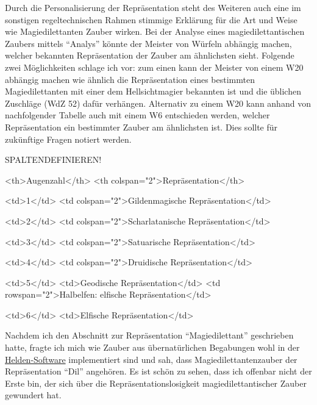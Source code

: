 Durch die Personalisierung der Repräsentation steht des Weiteren auch eine im sonstigen regeltechnischen Rahmen stimmige Erklärung für die Art und Weise wie Magiedilettanten Zauber wirken. Bei der Analyse eines magiedilettantischen Zaubers mittels \enquote{Analys} könnte der Meister von Würfeln abhängig machen, welcher bekannten Repräsentation der Zauber am ähnlichsten sieht. Folgende zwei Möglichkeiten schlage ich vor: zum einen kann der Meister von einem W20 abhängig machen wie ähnlich die Repräsentation eines bestimmten Magiedilettanten mit einer dem Hellsichtmagier bekannten ist und die üblichen Zuschläge (WdZ 52) dafür verhängen. Alternativ zu einem W20 kann anhand von nachfolgender Tabelle auch mit einem W6 entschieden werden, welcher Repräsentation ein bestimmter Zauber am ähnlichsten ist. Dies sollte für zukünftige Fragen notiert werden.
\begin{table}
	\centering
	\caption[Kurzbeschreibung für Verzeichnis]{Langbezeichnung für direkte Anzeige\label{identifier-vergeben}}
	\begin{tabular}{SPALTENDEFINIEREN!}
		\toprule

<th>Augenzahl</th>
<th colspan="2">Repräsentation</th>


<td>1</td>
<td colspan="2">Gildenmagische Repräsentation</td>


<td>2</td>
<td colspan="2">Scharlatanische Repräsentation</td>


<td>3</td>
<td colspan="2">Satuarische Repräsentation</td>


<td>4</td>
<td colspan="2">Druidische Repräsentation</td>


<td>5</td>
<td>Geodische Repräsentation</td>
<td rowspan="2">Halbelfen: elfische Repräsentation</td>


<td>6</td>
<td>Elfische Repräsentation</td>

		\bottomrule
	\end{tabular}
\end{table}

Nachdem ich den Abschnitt zur Repräsentation \enquote{Magiedilettant} geschrieben hatte, fragte ich mich wie Zauber aus übernatürlichen Begabungen wohl in der \href{http://www.helden-software.de/}{Helden-Software} implementiert sind und sah, dass Magiedilettantenzauber der Repräsentation \enquote{Dil} angehören. Es ist schön zu sehen, dass ich offenbar nicht der Erste bin, der sich über die Repräsentationslosigkeit magiedilettantischer Zauber gewundert hat.

